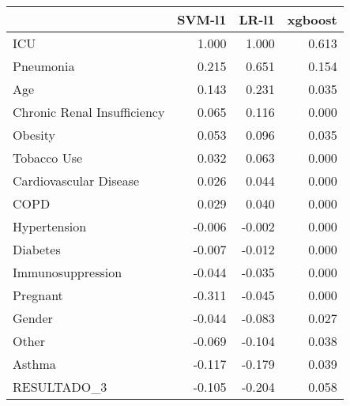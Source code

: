 \begin{tabular}{lrrr}
\toprule
{} &  SVM-l1 &  LR-l1 &  xgboost \\
\midrule
ICU                         &   1.000 &  1.000 &    0.613 \\
Pneumonia                   &   0.215 &  0.651 &    0.154 \\
Age                         &   0.143 &  0.231 &    0.035 \\
Chronic Renal Insufficiency &   0.065 &  0.116 &    0.000 \\
Obesity                     &   0.053 &  0.096 &    0.035 \\
Tobacco Use                 &   0.032 &  0.063 &    0.000 \\
Cardiovascular Disease      &   0.026 &  0.044 &    0.000 \\
COPD                        &   0.029 &  0.040 &    0.000 \\
Hypertension                &  -0.006 & -0.002 &    0.000 \\
Diabetes                    &  -0.007 & -0.012 &    0.000 \\
Immunosuppression           &  -0.044 & -0.035 &    0.000 \\
Pregnant                    &  -0.311 & -0.045 &    0.000 \\
Gender                      &  -0.044 & -0.083 &    0.027 \\
Other                       &  -0.069 & -0.104 &    0.038 \\
Asthma                      &  -0.117 & -0.179 &    0.039 \\
RESULTADO\_3                 &  -0.105 & -0.204 &    0.058 \\
\bottomrule
\end{tabular}
